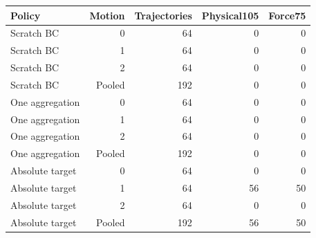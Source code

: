\begin{tabular}{lrrrr}
\toprule
Policy & Motion & Trajectories & Physical105 & Force75\\
\midrule
Scratch BC & 0 & 64 & 0 & 0\\
Scratch BC & 1 & 64 & 0 & 0\\
Scratch BC & 2 & 64 & 0 & 0\\
Scratch BC & Pooled & 192 & 0 & 0\\
One aggregation & 0 & 64 & 0 & 0\\
One aggregation & 1 & 64 & 0 & 0\\
One aggregation & 2 & 64 & 0 & 0\\
One aggregation & Pooled & 192 & 0 & 0\\
Absolute target & 0 & 64 & 0 & 0\\
Absolute target & 1 & 64 & 56 & 50\\
Absolute target & 2 & 64 & 0 & 0\\
Absolute target & Pooled & 192 & 56 & 50\\
\bottomrule
\end{tabular}
